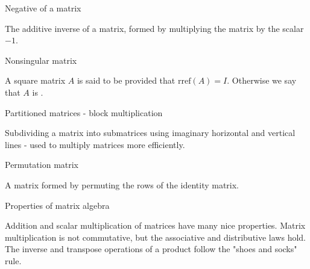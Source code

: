 \documentclass{ximera}
\begin{document}
Negative of a matrix
\begin{expandable}
    The additive inverse of a matrix, formed by multiplying the matrix by the scalar $-1$.
\end{expandable}



Nonsingular matrix
\begin{expandable}
    A square matrix $A$ is said to be  provided that $\mbox{rref}(A)=I$.  Otherwise we say that $A$ is .
\end{expandable}


Partitioned matrices - block multiplication
\begin{expandable}
    Subdividing a matrix into submatrices using imaginary horizontal and vertical lines - used to multiply matrices more efficiently.
\end{expandable}



Permutation matrix
\begin{expandable}
    A matrix formed by permuting the rows of the identity matrix.
\end{expandable}



Properties of matrix algebra
\begin{expandable}
    Addition and scalar multiplication of matrices have many nice properties. Matrix multiplication is not commutative, but the associative and distributive laws hold. The inverse and transpose operations of a product follow the "shoes and socks" rule.
\end{expandable}

\end{document}
